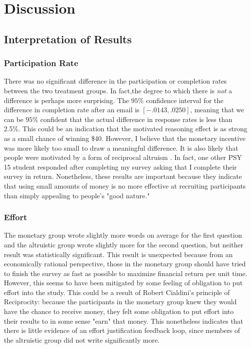 \documentclass[12pt]{article}
\begin{document}
\section{Discussion}
\subsection{Interpretation of Results}
\subsubsection{Participation Rate}
There was no significant difference in the participation or completion rates between the two treatment groups. In fact,the degree to which there is \textit{not} a difference is perhaps more surprising. The $95\%$ confidence interval for the difference in completion rate after an email is $[-.0143,.0250]$, meaning that we can be $95\%$ confident that the actual difference in response rates is less than 2.5\%. This could be an indication that the motivated reasoning effect is as strong as a small chance of winning \$40. However, I believe that the monetary incentive was more likely too small to draw a meaningful difference. It is also likely that people were motivated by a form of reciprocal altruism \citep{trivers}. In fact, one other PSY 15 student responded after completing my survey asking that I complete their survey in return. Nonetheless, these results are important because they indicate that using small amounts of money is no more effective at recruiting participants than simply appealing to people's "good nature."

\subsubsection{Effort}
The monetary group wrote slightly more words on average for the first question and the altruistic group wrote slightly more for the second question, but neither result was statistically significant. This result is unexpected because from an economically rational perspective, those in the monetary group should have tried to finish the survey as fast as possible to maximize financial return per unit time. However, this seems to have been mitigated by some feeling of obligation to put effort into the study. This could be a result of Robert Cialdini's principle of Reciprocity: because the participants in the monetary group knew they would have the chance to receive money, they felt some obligation to put effort into their results to in some sense "earn" that money. This nonetheless indicates that there is little evidence of an effort justification feedback loop, since members of the altruistic group did not write significantly more. 
\end{document}
